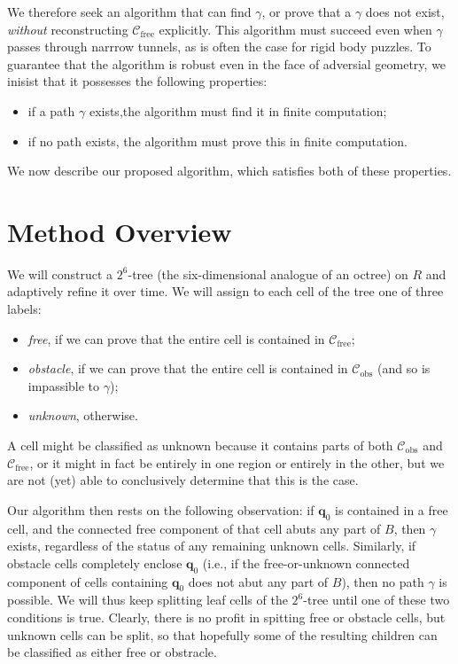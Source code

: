 \documentclass[review]{acmsiggraph}
\newcommand{\bq}{\mathbf{q}}
\newcommand{\Cfree}{\mathcal{C}_{\mathrm{free}}}
\newcommand{\Cobs}{\mathcal{C}_{\mathrm{obs}}}
\begin{document}
We therefore seek an algorithm that can find $\gamma$, or prove that a $\gamma$ does not exist, \emph{without} reconstructing $\Cfree$ explicitly. This algorithm must succeed even when $\gamma$ passes through narrrow tunnels, as is often the case for rigid body puzzles. To guarantee that the algorithm is robust even in the face of adversial geometry, we inisist that it possesses the following properties:
\begin{itemize}
\item if a path $\gamma$ exists,the algorithm must find it in finite computation;
\item if no path exists, the algorithm must prove this in finite computation.
\end{itemize}
We now describe our proposed algorithm, which satisfies both of these properties. 

\section{Method Overview}
We will construct a $2^6$-tree (the six-dimensional analogue of an octree) on $R$ and adaptively refine it over time. We will assign to each cell of the tree one of three labels:
\begin{itemize}
\item \emph{free}, if we can prove that the entire cell is contained in $\Cfree$;
\item \emph{obstacle}, if we can prove that the entire cell is contained in $\Cobs$ (and so is impassible to $\gamma$);
\item \emph{unknown}, otherwise.
\end{itemize}
A cell might be classified as unknown because it contains parts of both $\Cobs$ and $\Cfree$, or it might in fact be entirely in one region or entirely in the other, but we are not (yet) able to conclusively determine that this is the case.

Our algorithm then rests on the following observation: if $\bq_0$ is contained in a free cell, and the connected free component of that cell abuts any part of $B$, then $\gamma$ exists, regardless of the status of any remaining unknown cells. Similarly, if obstacle cells completely enclose $\bq_0$ (i.e., if the free-or-unknown connected component of cells containing $\bq_0$ does not abut any part of $B$), then no path $\gamma$ is possible. We will thus keep splitting leaf cells of the $2^6$-tree until one of these two conditions is true. Clearly, there is no profit in spitting free or obstacle cells, but unknown cells can be split, so that hopefully some of the resulting children can be classified as either free or obstracle. 
\end{document}
